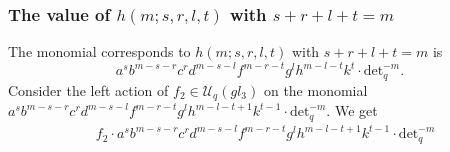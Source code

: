 \documentclass[table,a4paper,reqno]{amsart}
\numberwithin{equation}{section}
\theoremstyle{definition}
\begin{document}
\subsubsection{The value of $h(m;s,r,l,t)$ with $s+r+l+t=m$}
The monomial corresponds to $h(m;s,r,l,t)$ with $s+r+l+t=m$ is
\begin{equation}
    a^sb^{m-s-r}c^rd^{m-s-l}f^{m-r-t}g^lh^{m-l-t}k^t\cdot\text{det}_q^{-m}.
\end{equation}
Consider the left action of $f_2\in\mathcal{U}_q(gl_3)$ on the monomial\\ $a^sb^{m-s-r}c^rd^{m-s-l}f^{m-r-t}g^lh^{m-l-t+1}k^{t-1}\cdot\text{det}_q^{-m}$. We get
\begin{equation}\label{eq:4.59}
    \begin{split}
        &f_2\cdot a^sb^{m-s-r}c^rd^{m-s-l}f^{m-r-t}g^lh^{m-l-t+1}k^{t-1}\cdot\text{det}_q^{-m}\\

\end{split}
\end{equation}
\end{document}
